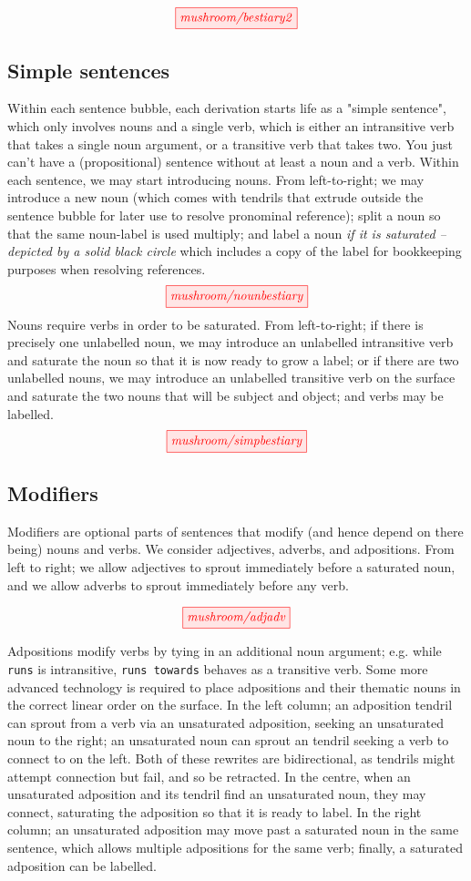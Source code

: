 \[
\tikzfig{mushroom/bestiary2}
\]

\subsection{Simple sentences}
Within each sentence bubble, each derivation starts life as a "simple sentence", which only involves nouns and a single verb, which is either an intransitive verb that takes a single noun argument, or a transitive verb that takes two. You just can't have a (propositional) sentence without at least a noun and a verb. Within each sentence, we may start introducing nouns. From left-to-right; we may introduce a new noun (which comes with tendrils that extrude outside the sentence bubble for later use to resolve pronominal reference); split a noun so that the same noun-label is used multiply; and label a noun \emph{if it is saturated -- depicted by a solid black circle} which includes a copy of the label for bookkeeping purposes when resolving references.
\[
\tikzfig{mushroom/nounbestiary}
\]
Nouns require verbs in order to be saturated. From left-to-right; if there is precisely one unlabelled noun, we may introduce an unlabelled intransitive verb and saturate the noun so that it is now ready to grow a label; or if there are two unlabelled nouns, we may introduce an unlabelled transitive verb on the surface and saturate the two nouns that will be subject and object; and verbs may be labelled.
\[
\tikzfig{mushroom/simpbestiary}
\]

\subsection{Modifiers}

Modifiers are optional parts of sentences that modify (and hence depend on there being) nouns and verbs. We consider adjectives, adverbs, and adpositions. From left to right; we allow adjectives to sprout immediately before a saturated noun, and we allow adverbs to sprout immediately before any verb.

\[
\tikzfig{mushroom/adjadv}
\]

Adpositions modify verbs by tying in an additional noun argument; e.g. while \texttt{runs} is intransitive, \texttt{runs towards} behaves as a transitive verb. Some more advanced technology is required to place adpositions and their thematic nouns in the correct linear order on the surface. In the left column; an adposition tendril can sprout from a verb via an unsaturated adposition, seeking an unsaturated noun to the right; an unsaturated noun can sprout an tendril seeking a verb to connect to on the left. Both of these rewrites are bidirectional, as tendrils might attempt connection but fail, and so be retracted. In the centre, when an unsaturated adposition and its tendril find an unsaturated noun, they may connect, saturating the adposition so that it is ready to label. In the right column; an unsaturated adposition may move past a saturated noun in the same sentence, which allows multiple adpositions for the same verb; finally, a saturated adposition can be labelled.

